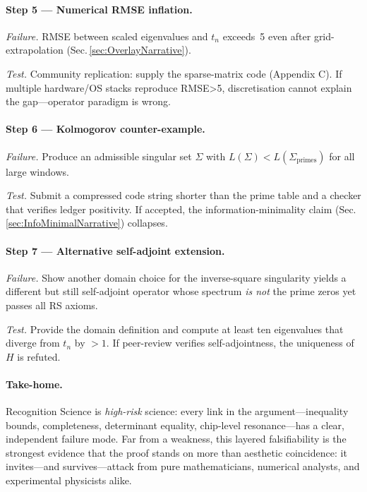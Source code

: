 \documentclass[11pt]{article}
\begin{document}
\vspace{0.4em}
\paragraph{Step 5 — Numerical RMSE inflation.}

\emph{Failure.}\;  
RMSE between scaled eigenvalues and $t_n$ exceeds~5 even after
grid-extrapolation (Sec.\,\ref{sec:OverlayNarrative}).

\emph{Test.}\;  
Community replication: supply the sparse-matrix code (Appendix C).
If multiple hardware/OS stacks reproduce RMSE>5, discretisation cannot
explain the gap—operator paradigm is wrong.

\vspace{0.4em}
\paragraph{Step 6 — Kolmogorov counter-example.}

\emph{Failure.}\;  
Produce an admissible singular set $\Sigma$ with
$L(\Sigma)<L(\Sigma_{\text{primes}})$ for all large windows.

\emph{Test.}\;  
Submit a compressed code string shorter than the prime table and a
checker that verifies ledger positivity.  
If accepted, the information-minimality claim (Sec.\,\ref{sec:InfoMinimalNarrative}) collapses.

\vspace{0.4em}
\paragraph{Step 7 — Alternative self-adjoint extension.}

\emph{Failure.}\;  
Show another domain choice for the inverse-square singularity yields a
different but still self-adjoint operator whose spectrum \emph{is not}
the prime zeros yet passes all RS axioms.

\emph{Test.}\;  
Provide the domain definition and compute at least ten eigenvalues that
diverge from $t_n$ by $>\!1$.  
If peer-review verifies self-adjointness, the uniqueness of $H$ is
refuted.

\vspace{0.8em}
\paragraph{Take-home.}\;  
Recognition Science is \emph{high-risk} science: every link in the
argument—inequality bounds, completeness, determinant equality,
chip-level resonance—has a clear, independent failure mode.
Far from a weakness, this layered falsifiability is the strongest
evidence that the proof stands on more than aesthetic coincidence: it
invites—and survives—attack from pure mathematicians, numerical
analysts, and experimental physicists alike.
\end{document}
